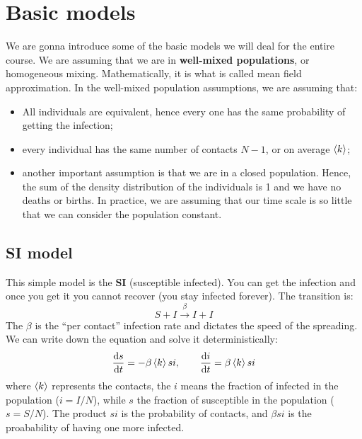 \documentclass[../main/main.tex]{subfiles}
\begin{document}

\section{Basic models}

We are gonna introduce some of the basic models we will deal for the entire course.
We are assuming that we are in \textbf{well-mixed populations}, or homogeneous mixing. Mathematically, it is what is called mean field approximation.
In the well-mixed population assumptions, we are assuming that:
\begin{itemize}
\item All individuals are equivalent, hence every one has the same probability of getting the infection;
\item every individual has the same number of contacts \( N-1 \), or on average \( \expval{k}  \);
\item another important assumption is that we are in a closed population. Hence, the sum of the density distribution of the individuals is 1 and we have no deaths or births. In practice, we are assuming that our time scale is so little that we can consider the population constant.
\end{itemize}

\subsection{SI model}

This simple model is the \textbf{SI} (susceptible infected). You can get the infection and once you get it you cannot recover (you stay infected forever).
The transition is:
\begin{equation*}
  S + I \overset{\beta }{\rightarrow} I + I
\end{equation*}
The \( \beta  \) is the “per contact” infection rate and dictates the speed of the spreading. We can write down the equation and solve it deterministically:
\begin{equation*}
  \dv{s}{t} = - \beta \expval{k} s i, \qquad \dv{i}{t} = \beta \expval{k} s i
\end{equation*}
where \( \expval{k}  \) represents the contacts, the \( i \) means the fraction of infected in the population (\( i=I/N \)), while \( s \) the fraction of susceptible in the population (\( s=S/N \)).
The product \( s i \) is the probability of contacts, and \( \beta  s i \) is the proabability of having one more infected.
\end{document}

